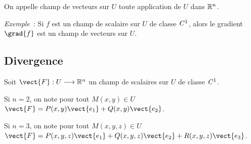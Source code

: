 On appelle champ de vecteurs sur $U$ toute application de $U$ dans $\mathbb{R}^n$.

\emph{Exemple}~: Si $f$ est un champ de scalaire sur $U$ de classe $\mathit{C}^1$, alors le gradient $\grad{f}$ est un champ de vecteurs sur $U$.


\subsection{Divergence}

Soit $\vect{F} : U \longrightarrow \R^n$ un champ de scalaires sur $U$ de classe $\mathit{C}^1$.

Si $n=2$, on note pour tout $M(x,y) \in U$ $\vect{F}=P(x,y)\vect{e_1} + Q(x,y)\vect{e_2}$.

Si $n=3$, on note pour tout $M(x,y,z) \in U$ $\vect{F}=P(x,y,z)\vect{e_1} + Q(x,y,z)\vect{e_2}+R(x,y,z)\vect{e_3}$.

